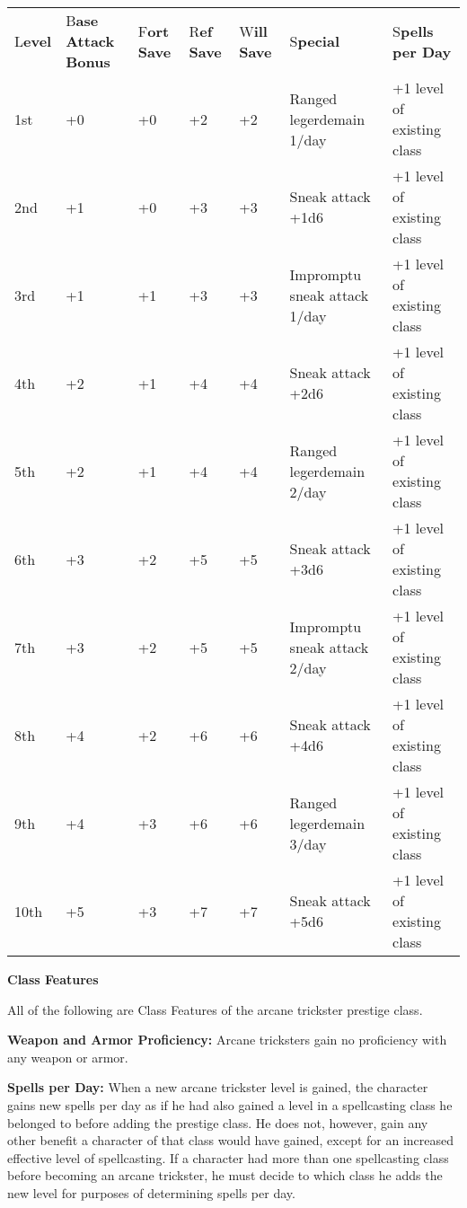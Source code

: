 \documentclass{article}
\begin{document}
\vspace{12pt}
\begin{tabular}{|>{\raggedright}p{21pt}|>{\raggedright}p{24pt}|>{\raggedright}p{17pt}|>{\raggedright}p{17pt}|>{\raggedright}p{17pt}|>{\raggedright}p{91pt}|>{\raggedright}p{76pt}|}
\hline
\multicolumn{7}{|p{266pt}|}{\subsection*{T\textbf{able: The Arcane Trickster}}}\tabularnewline
\hline
L\textbf{evel} & B\textbf{ase}\linebreak{}
\textbf{Attack}\linebreak{}
\textbf{Bonus} & F\textbf{ort}\linebreak{}
\textbf{Save} & R\textbf{ef}\linebreak{}
\textbf{Save} & W\textbf{ill}\linebreak{}
\textbf{Save} & S\textbf{pecial} & S\textbf{pells per Day}\tabularnewline
\hline
1st & +0 & +0 & +2 & +2 & Ranged legerdemain 1/day & +1 level of existing class\tabularnewline
\hline
2nd & +1 & +0 & +3 & +3 & Sneak attack +1d6 & +1 level of existing class\tabularnewline
\hline
3rd & +1 & +1 & +3 & +3 & Impromptu sneak attack 1/day & +1 level of existing class\tabularnewline
\hline
4th & +2 & +1 & +4 & +4 & Sneak attack +2d6 & +1 level of existing class\tabularnewline
\hline
5th & +2 & +1 & +4 & +4 & Ranged legerdemain 2/day & +1 level of existing class\tabularnewline
\hline
6th & +3 & +2 & +5 & +5 & Sneak attack +3d6 & +1 level of existing class\tabularnewline
\hline
7th & +3 & +2 & +5 & +5 & Impromptu sneak attack 2/day & +1 level of existing class\tabularnewline
\hline
8th & +4 & +2 & +6 & +6 & Sneak attack +4d6 & +1 level of existing class\tabularnewline
\hline
9th & +4 & +3 & +6 & +6 & Ranged legerdemain 3/day & +1 level of existing class\tabularnewline
\hline
10th & +5 & +3 & +7 & +7 & Sneak attack +5d6 & +1 level of existing class\tabularnewline
\hline
\end{tabular}

\vspace{12pt}
\textbf{Class Features}

All of the following are Class Features of the arcane trickster prestige class.

\textbf{Weapon and Armor Proficiency:} Arcane tricksters gain no proficiency with 
any weapon or armor.

\textbf{Spells per Day:} When a new arcane trickster level is gained, the character 
gains new spells per day as if he had also gained a level in a spellcasting class 
he belonged to before adding the prestige class. He does not, however, gain any 
other benefit a character of that class would have gained, except for an increased 
effective level of spellcasting. If a character had more than one spellcasting 
class before becoming an arcane trickster, he must decide to which class he adds 
the new level for purposes of determining spells per day.
\end{document}
